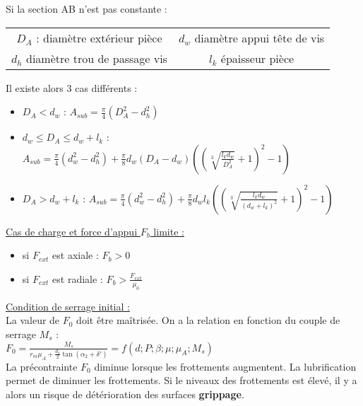 \documentclass[../main.tex]{subfiles}
\begin{document}
Si la section AB n'est pas constante :\\
\begin{table}[hbt!]
    \centering
    \begin{tabular}{c|c}
        $D_A$ : diamètre extérieur pièce & $d_w$ diamètre appui tête de vis \\
        $d_h$ diamètre trou de passage vis & $l_k$ épaisseur pièce\\
    \end{tabular}
\end{table}
Il existe alors 3 cas différents :\\
\begin{itemize}
    \item $D_A < d_w$ : $A_{sub} = \frac{\pi}{4}(D_A^2-d_h^2)$\\
    \item $d_w \leq D_A \leq d_w+l_k$ : $A_{sub} = \frac{\pi}{4}(d_w^2-d_h^2)+\frac{\pi}{8} d_w (D_A-d_w) ((\sqrt[3]{\frac{l_k d_w}{D_A^2}}+1)^2-1)$\\
    \item $D_A > d_w+l_k$ : $A_{sub} = \frac{\pi}{4}(d_w^2-d_h^2)+\frac{\pi}{8} d_w l_k ((\sqrt[3]{\frac{l_k d_w}{(d_w+l_k)^2}}+1)^2-1)$\\
\end{itemize}

\quad \underline{Cas de charge et force d'appui $F_b$ limite :}\\
\begin{itemize}
    \item si $F_{ext}$ est axiale : $F_b>0$\\
    \item si $F_{ext}$ est radiale : $F_b > \frac{F_{ext}}{\mu_0}$\\
\end{itemize}
\quad \underline{Condition de serrage initial :}\\
La valeur de $F_0$ doit être maîtrisée. On a la relation en fonction du couple de serrage $M_s$ : \\
$F_0 = \frac{M_s}{r_m \mu_A + \frac{d_2}{2} \tan(\alpha_2+\delta')} = f(d;P;\beta; \mu; \mu_A; M_s)$\\

La précontrainte $F_0$ diminue lorsque les frottements augmentent. La lubrification permet de diminuer les frottements. Si le niveaux des frottements est élevé, il y a alors un risque de détérioration des surfaces \textbf{grippage}.\\
\end{document}
